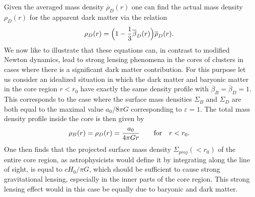 \documentclass[a4paper,12pt]{article}
\begin{document}
Given the averaged mass density $\overline{\rho}_D(r)$ one can find the actual mass density $\rho_{D}(r)$ for the apparent dark matter via the relation  
\begin{equation}
\rho_D(r) =\Bigl(1-{1\over 3}\overline{\beta}_D(r)\Bigr) \overline{{\rho}}_D(r)  . 
\end{equation}
 We now like to illustrate that these equations can, in contrast to modified Newton dynamics, lead to strong lensing phenomena in the cores of clusters in cases where there is a significant dark matter contribution. For this purpose let us consider an idealized situation in which the dark matter and baryonic matter in the core region $r<r_0$ have exactly the same density profile with $\overline{\beta}_B = \overline{\beta}_D =1$. This corresponds to the case where the surface mass densities $\Sigma_B$ and $\Sigma_D$ are both equal to   the maximal value $a_0/8\pi G$ corresponding to  $\varepsilon=1$.  The total mass density profile inside the core is then given by 
 \begin{equation}
 \rho_B(r) =  \rho_D(r) = {a_0\over 4\pi G r} \qquad\mbox{for} \quad r<r_0  .
\end{equation}
 One then finds that the projected surface mass density $\Sigma_{proj}(\!<\!r_0 )$ of the entire core region, as astrophysicists would define it by integrating along the line of sight,  is equal to $cH_0/\pi G$, which should be sufficient to cause strong gravitational  lensing, especially in the inner parts of the core region. This strong lensing effect would in this case be equally due to baryonic and dark matter.  
 
\end{document}
